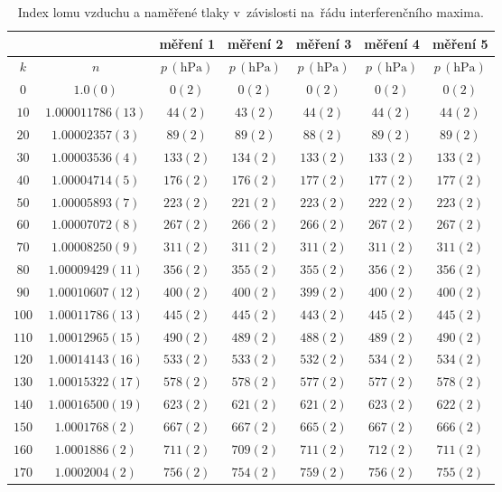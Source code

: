 \documentclass{../concepts/titul_zprava_p/prepareprotokolZprava} %
\begin{document}
\begin{table}[!htbp]
\centering
\caption{Index lomu vzduchu a naměřené tlaky v~závislosti na~řádu interferenčního maxima.}
\begin{tabular}{cc|ccccc}
 \toprule
 & & měření 1 & měření 2 & měření 3 & měření 4 & měření 5 \\
 \midrule
 $k$ & $n$ & $p\, (\mathrm{hPa})$ & $p\, (\mathrm{hPa})$ & $p\, (\mathrm{hPa})$ & $p\, (\mathrm{hPa})$ & $p\, (\mathrm{hPa})$ \\
 \midrule
 $0$ & $1.0(0)$ & $0(2)$ & $0(2)$ & $0(2)$ & $0(2)$ & $0(2)$ \\
 $10$ & $1.000011786(13)$ & $44(2)$ & $43(2)$ & $44(2)$ & $44(2)$ & $44(2)$ \\
 $20$ & $1.00002357(3)$ & $89(2)$ & $89(2)$ & $88(2)$ & $89(2)$ & $89(2)$ \\
 $30$ & $1.00003536(4)$ & $133(2)$ & $134(2)$ & $133(2)$ & $133(2)$ & $133(2)$ \\
 $40$ & $1.00004714(5)$ & $176(2)$ & $176(2)$ & $177(2)$ & $177(2)$ & $177(2)$ \\
 $50$ & $1.00005893(7)$ & $223(2)$ & $221(2)$ & $223(2)$ & $222(2)$ & $223(2)$ \\
 $60$ & $1.00007072(8)$ & $267(2)$ & $266(2)$ & $266(2)$ & $267(2)$ & $267(2)$ \\
 $70$ & $1.00008250(9)$ & $311(2)$ & $311(2)$ & $311(2)$ & $311(2)$ & $311(2)$ \\
 $80$ & $1.00009429(11)$ & $356(2)$ & $355(2)$ & $355(2)$ & $356(2)$ & $356(2)$ \\
 $90$ & $1.00010607(12)$ & $400(2)$ & $400(2)$ & $399(2)$ & $400(2)$ & $400(2)$ \\
 $100$ & $1.00011786(13)$ & $445(2)$ & $445(2)$ & $443(2)$ & $445(2)$ & $445(2)$ \\
 $110$ & $1.00012965(15)$ & $490(2)$ & $489(2)$ & $488(2)$ & $489(2)$ & $490(2)$ \\
 $120$ & $1.00014143(16)$ & $533(2)$ & $533(2)$ & $532(2)$ & $534(2)$ & $534(2)$ \\
 $130$ & $1.00015322(17)$ & $578(2)$ & $578(2)$ & $577(2)$ & $577(2)$ & $578(2)$ \\
 $140$ & $1.00016500(19)$ & $623(2)$ & $621(2)$ & $621(2)$ & $623(2)$ & $622(2)$ \\
 $150$ & $1.0001768(2)$ & $667(2)$ & $667(2)$ & $665(2)$ & $667(2)$ & $666(2)$ \\
 $160$ & $1.0001886(2)$ & $711(2)$ & $709(2)$ & $711(2)$ & $712(2)$ & $711(2)$ \\
 $170$ & $1.0002004(2)$ & $756(2)$ & $754(2)$ & $759(2)$ & $756(2)$ & $755(2)$ \\

\end{tabular}
\end{table}
\end{document}

